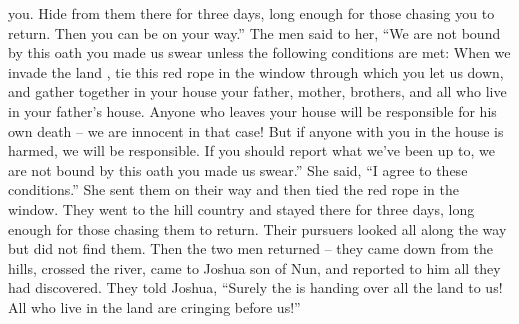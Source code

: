 {you. Hide
from them there
for three
days,
long
enough for those
chasing
you to
return.
Then
you can
be on your way.”
The men
said
to
her,
“We
are not bound
by this
oath you made us swear unless the following conditions are met:
When we
invade
the land
, tie
this
red
rope
in the window
through which
you let us down,
and gather together
in your house your father,
mother,
brothers,
and all
who live in your father’s
house.
Anyone
who
leaves
your house
will be responsible for his own death – we are innocent in that case! But if anyone with you in the house is harmed, we will be responsible.
If
you should report
what
we’ve
been
up to, we are not bound
by this oath you made us swear.”
She said,
“I agree
to these conditions.”
She sent
them on their way
and then tied
the red
rope
in the window.
They went
to the hill country
and stayed
there
for three
days,
long enough
for those chasing
them to return.
Their pursuers
looked
all
along the way
but did not
find them.
Then the two
men
returned
– they came down
from the hills,
crossed
the river, came
to
Joshua
son
of Nun,
and reported
to him all
they had discovered.
They told
Joshua,
“Surely
the {}
is handing
over all
the land
to us! All
who live
in the land
are cringing
before us!”

}
